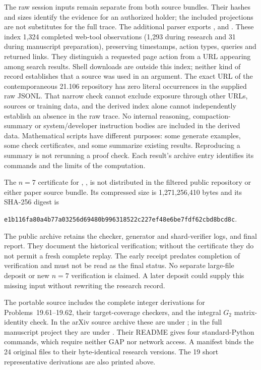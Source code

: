 The raw session inputs remain separate from both source bundles.
Their hashes and sizes identify the evidence for an authorized holder;
the included projections are not substitutes for the full trace.
The additional  parser exports
, 
and . These index 1,324 completed
web-tool observations (1,293 during research and 31 during manuscript
preparation), preserving timestamps, action types, queries and returned
links. They distinguish a requested page action from a URL appearing
among search results. Shell downloads are outside this index; neither
kind of record establishes that a source was used in an argument.
The exact URL of the contemporaneous 21.106 repository has zero literal
occurrences in the supplied raw JSONL. That narrow check cannot exclude
exposure through other URLs, sources or training data, and the derived
index alone cannot independently establish an absence in the raw trace.
No internal reasoning, compaction-summary or system/developer
instruction bodies are included in the derived data. Mathematical
scripts have different purposes: some generate examples, some check
certificates, and some summarize existing results. Reproducing a
summary is not rerunning a proof check. Each result's archive entry
identifies its commands and the limits of the computation.

The \(n=7\) certificate for ,
, is not distributed in the
filtered public repository or either paper source bundle. Its compressed
size is 1,271,256,410 bytes and its SHA-256 digest is
\begin{center}\small
\nolinkurl{e1b116fa80a4b77a03256d69480b996318522c227ef48e6be7fdf62cbd8bcd8c}.
\end{center}
The public archive retains the checker, generator and shard-verifier
logs, and final report. They document the historical verification;
without the certificate they do not permit a fresh complete replay.
The early  receipt predates completion
of verification and must not be read as the final status.
No separate large-file deposit or new \(n=7\) verification is claimed.
A later deposit could supply this missing input without rewriting the
research record.

The portable source includes the complete integer derivations for
Problems~19.61--19.62, their target-coverage checkers, and the integral
\(G_2\) matrix-identity check. In the arXiv source archive these are
under ; in the full manuscript project they are under
. Their README gives four standard-Python
commands, which require neither GAP nor network access. A manifest
binds the 24 original files to their byte-identical research versions.
The 19 short representative derivations are also printed above.

